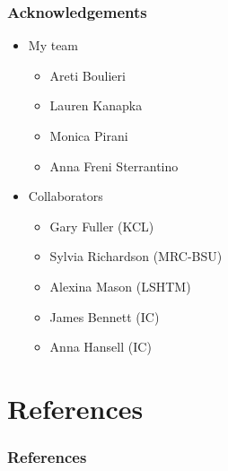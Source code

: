 \documentclass[slidestop,compress,serif,10pt]{beamer}
\begin{document}
\begin{frame}
\frametitle{Acknowledgements}
\begin{itemize}
\vfill\item My team
\begin{itemize}
\vspace{5pt}\item Areti Boulieri
\vspace{5pt}\item Lauren Kanapka
\vspace{5pt}\item Monica Pirani
\vspace{5pt}\item Anna Freni Sterrantino
\end{itemize}
\vfill\item Collaborators
\begin{itemize}
\vspace{5pt}\item Gary Fuller (KCL)
\vspace{5pt}\item Sylvia Richardson (MRC-BSU)
\vspace{5pt}\item Alexina Mason (LSHTM)
\vspace{5pt}\item James Bennett (IC)
\vspace{5pt}\item Anna Hansell (IC)

\end{itemize}
\end{itemize}
\end{frame}

\section{References}
\begin{frame}
\frametitle{References}
\tiny {}

\end{frame}

\begin{frame}
\centering\vfill\fontsize{40}{40}
\end{frame}
\end{document}
